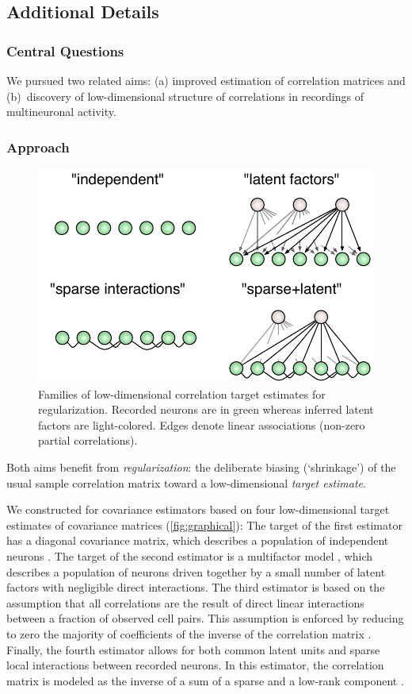 \documentclass[12pt]{amsart}
\begin{document}
\subsection*{Additional Details}
\subsubsection*{Central Questions} We pursued two related aims: (a) improved estimation of correlation matrices and (b)~discovery of low-dimensional structure of correlations in recordings of multineuronal activity. 

\subsubsection*{Approach}
\begin{figure}
\centering
\vspace{-6pt}
\includegraphics{./Simulation.pdf}
\caption{Families of low-dimensional correlation target estimates for regularization. Recorded neurons are in green whereas inferred latent factors are light-colored. Edges denote linear associations (non-zero partial correlations).}

\label{fig:graphical}
\end{figure}
Both aims benefit from \emph{regularization}: the deliberate biasing (`shrinkage') of the usual sample correlation matrix toward a low-dimensional \emph{target estimate}. 

We constructed for covariance estimators based on four low-dimensional target estimates of covariance matrices  (\autoref{fig:graphical}): 
The target of the first estimator has a diagonal covariance matrix, which describes a population of independent neurons \cite{Ledoit:2004}. 
The target of the second estimator is a multifactor model \cite{Fan:2008}, which describes a population of neurons driven together by a small number of latent factors with negligible direct interactions.
The third estimator is based on the assumption that all correlations are the result of direct linear interactions between a fraction of observed cell pairs. This assumption is enforced by reducing to zero the majority of coefficients of the inverse of the correlation matrix \cite{Dempster:1972}. 
Finally, the fourth estimator allows for both common latent units and sparse local interactions between recorded neurons.  
In this estimator, the correlation matrix is modeled as the inverse of a sum of a sparse and a low-rank component \cite{Chandrasekaran:2010}.
\end{document}
